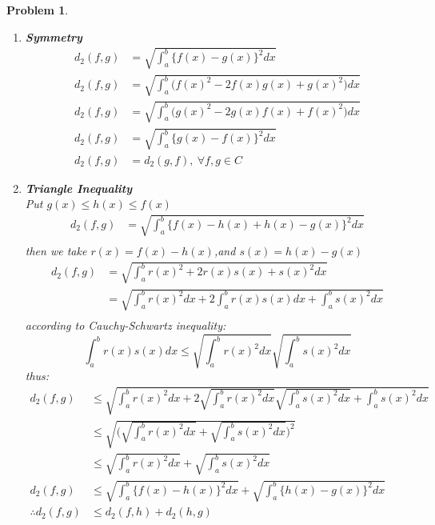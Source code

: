 \documentclass[a4paper,12pt]{article}
\newtheorem{prob}{Problem}[]
\begin{document}
\begin{prob}
\begin{enumerate}[label=(\alph*)]
		\item \textbf{Symmetry}
		\begin{equation*}
		\begin{aligned}
		d_2(f,g) &= \sqrt{\int_{a}^{b}\{f(x)-g(x)\}^2dx}\\
		d_2(f,g) &= \sqrt{\int_{a}^{b}\bigg( f(x)^2 -2f(x)g(x) + g(x)^2 \bigg)dx}\\
		d_2(f,g) &= \sqrt{\int_{a}^{b}\bigg( g(x)^2 -2g(x)f(x) + f(x)^2 \bigg)dx}\\
		d_2(f,g) &= \sqrt{\int_{a}^{b}\{g(x)-f(x)\}^2dx}\\
		d_2(f,g) &= d_2(g,f),\ \forall f,g \in C
		\end{aligned}
		\end{equation*}
		
		\item \textbf{Triangle Inequality}\\
		Put $g(x)\leq h(x)\leq f(x)$
		\begin{equation*}
		\begin{aligned}
		d_2(f,g) &= \sqrt{\int_{a}^{b}\{f(x)-h(x)+h(x)-g(x)\}^2dx}\\
		\end{aligned}
		\end{equation*}
		then we take $r(x)=f(x)-h(x)$,and $s(x)=h(x)-g(x)$\\
		\begin{equation*}
		\begin{aligned}
		d_2(f,g) &= \sqrt{\int_{a}^{b}r(x)^2 +2r(x)s(x) + s(x)^2dx}\\
		&= \sqrt{\int_{a}^{b}r(x)^2 dx +2\int_{a}^{b}r(x)s(x) dx + \int_{a}^{b}s(x)^2dx}\\
		\end{aligned}
		\end{equation*}
		according to Cauchy-Schwartz inequality:
		\begin{equation*}
		\int_{a}^{b}r(x)s(x) dx \leq \sqrt{\int_{a}^{b}r(x)^2 dx} \sqrt{\int_{a}^{b}s(x)^2 dx}
		\end{equation*}
		thus:
		\begin{equation*}
		\begin{aligned}
		d_2(f,g) &\leq \sqrt{\int_{a}^{b}r(x)^2 dx +2\sqrt{\int_{a}^{b}r(x)^2 dx} \sqrt{\int_{a}^{b}s(x)^2 dx} + \int_{a}^{b}s(x)^2dx}\\
		&\leq \sqrt{\Bigg( \sqrt{\int_{a}^{b}r(x)^2 dx} + \sqrt{\int_{a}^{b}s(x)^2dx} \Bigg)^2}\\
		&\leq \sqrt{\int_{a}^{b}r(x)^2 dx} + \sqrt{\int_{a}^{b}s(x)^2dx}\\
		d_2(f,g) &\leq \sqrt{\int_{a}^{b}\{ f(x)-h(x) \}^2 dx} + \sqrt{\int_{a}^{b}\{ h(x)-g(x) \}^2dx}\\
		\therefore d_2(f,g) &\leq d_2(f,h) + d_2(h,g)
		\end{aligned}
		\end{equation*}
	\end{enumerate}
\end{prob}
\end{document}
